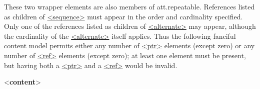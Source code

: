  These two wrapper elements are also members of \textsf{att.repeatable}. References listed as children of \hyperref[TEI.sequence]{<sequence>} must appear in the order and cardinality specified. Only one of the references listed as children of \hyperref[TEI.alternate]{<alternate>} may appear, although the cardinality of the \hyperref[TEI.alternate]{<alternate>} itself applies. Thus the following fanciful content model permits either any number of \hyperref[TEI.ptr]{<ptr>} elements (except zero) or any number of \hyperref[TEI.ref]{<ref>} elements (except zero); at least one element must be present, but having both a \hyperref[TEI.ptr]{<ptr>} and a \hyperref[TEI.ref]{<ref>} would be invalid. \par\bgroup{}\exampleFont \begin{shaded}\noindent\mbox{}{<\textbf{content}>}\mbox{}\newline 
{}\mbox{}\newline 
\hspace*{1em}\mbox{}\newline 
\hspace*{1em}\mbox{}\newline 

\end{shaded}
